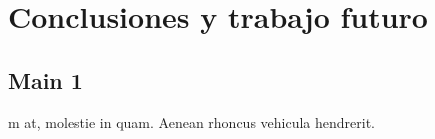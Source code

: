 
\chapter{Conclusiones y trabajo futuro} %

\label{ChapterX} %


\section{Main  1}

m at, molestie in quam. Aenean rhoncus vehicula hendrerit.
